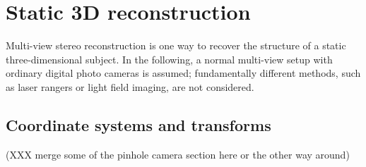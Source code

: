 
\clearpage
\section{Static 3D reconstruction}

Multi-view stereo reconstruction is one way to recover the structure of a static three-dimensional subject.
In the following, a normal multi-view setup with ordinary digital photo cameras is assumed;
fundamentally different methods, such as laser rangers or light field imaging, are not considered.














\subsection{Coordinate systems and transforms} \label{sec:coord} %

(XXX merge some of the pinhole camera section here or the other way around)

